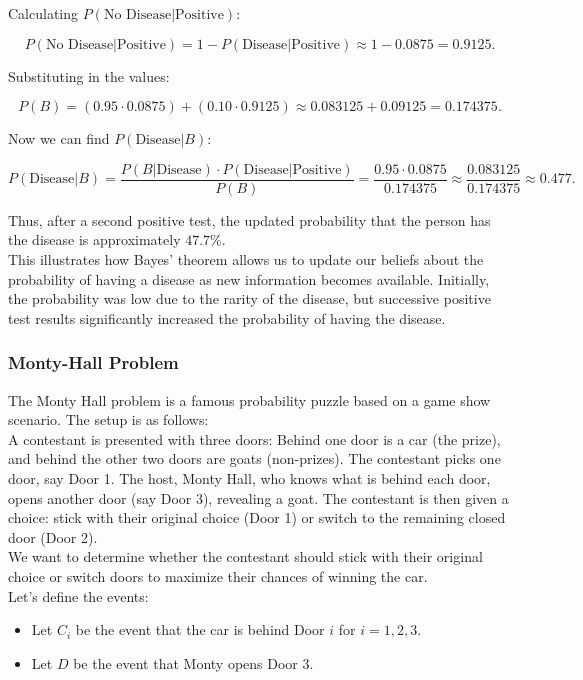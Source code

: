 Calculating \(P(\text{No Disease} | \text{Positive})\):

\[
P(\text{No Disease} | \text{Positive}) = 1 - P(\text{Disease} | \text{Positive}) \approx 1 - 0.0875 = 0.9125.
\]

Substituting in the values:

\[
P(B) = (0.95 \cdot 0.0875) + (0.10 \cdot 0.9125) \approx 0.083125 + 0.09125 = 0.174375.
\]

Now we can find \(P(\text{Disease} | B)\):

\[
P(\text{Disease} | B) = \frac{P(B | \text{Disease}) \cdot P(\text{Disease} | \text{Positive})}{P(B)} = \frac{0.95 \cdot 0.0875}{0.174375} \approx \frac{0.083125}{0.174375} \approx 0.477.
\]

Thus, after a second positive test, the updated probability that the person has the disease is approximately \(47.7\%\).\\

This illustrates how Bayes' theorem allows us to update our beliefs about the probability of having a disease as new information becomes available. Initially, the probability was low due to the rarity of the disease, but successive positive test results significantly increased the probability of having the disease.

\subsubsection{Monty-Hall Problem}

The Monty Hall problem is a famous probability puzzle based on a game show scenario. The setup is as follows: \\

A contestant is presented with three doors: Behind one door is a car (the prize), and behind the other two doors are goats (non-prizes). The contestant picks one door, say Door 1. The host, Monty Hall, who knows what is behind each door, opens another door (say Door 3), revealing a goat. The contestant is then given a choice: stick with their original choice (Door 1) or switch to the remaining closed door (Door 2).\\

We want to determine whether the contestant should stick with their original choice or switch doors to maximize their chances of winning the car.\\

Let's define the events:

\begin{itemize}
    \item Let \(C_i\) be the event that the car is behind Door \(i\) for \(i = 1, 2, 3\).
    \item Let \(D\) be the event that Monty opens Door 3.
\end{itemize}

